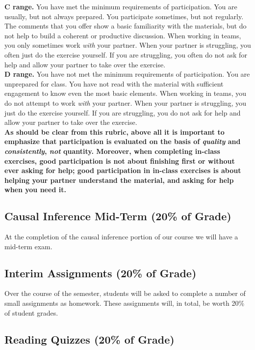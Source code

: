 \documentclass[12pt]{article}
\begin{document}
\textbf{C range.}  You have met the minimum requirements of participation.  You are usually, but not always prepared.  You participate sometimes, but not regularly.  The comments that you offer show a basic familiarity with the materials, but do not help to build a coherent or productive discussion.  When working in teams, you only sometimes work \emph{with} your partner. When your partner is struggling, you often just do the exercise yourself. If you are struggling, you often do not ask for help and allow your partner to take over the exercise. \\

\textbf{D range.}  You have not met the minimum requirements of participation.  You are unprepared for class.  You have not read with the material with sufficient engagement to know even the most basic elements.  When working in teams, you do not attempt to work \emph{with} your partner. When your partner is struggling, you just do the exercise yourself. If you are struggling, you do not ask for help and allow your partner to take over the exercise.\\

\textbf{As should be clear from this rubric, above all it is important to emphasize that participation is evaluated on the basis of \emph{quality} and \emph{consistently}, \emph{not} quantity. Moreover, when completing in-class exercises, good participation is not about finishing first or without ever asking for help; good participation in in-class exercises is about helping your partner understand the material, and asking for help when you need it.}

\subsection{Causal Inference Mid-Term (20\% of Grade)}

At the completion of the causal inference portion of our course we will have a mid-term exam. 

\subsection{Interim Assignments (20\% of Grade)}

Over the course of the semester, students will be asked to complete a number of small assignments as homework. These assignments will, in total, be worth 20\% of student grades.

\subsection{Reading Quizzes (20\% of Grade)}
\end{document}

